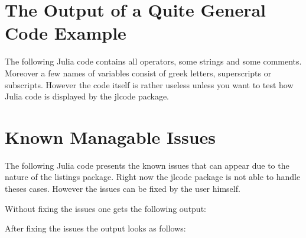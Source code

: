 \documentclass[11pt, a4paper]{scrartcl}
\begin{document}
\section*{The Output of a Quite General Code Example}
The following Julia code contains all operators, some strings and some comments.
Moreover a few names of variables consist of greek letters, superscripts or
subscripts. However the code itself is rather useless unless you want to test
how Julia code is displayed by the jlcode package.

\newpage

\section*{Known Managable Issues}
\noindent
The following Julia code presents the known issues that can appear due to the
nature of the listings package. Right now the jlcode package is not able to
handle theses cases. However the issues can be fixed by the user himself.

\vspace{2\baselineskip}\noindent
Without fixing the issues one gets the following output:


\vspace{2\baselineskip}\noindent
After fixing the issues the output looks as follows:

\end{document}
